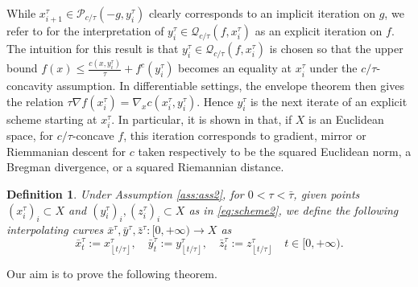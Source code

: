 \documentclass[reqno]{amsart}
\newcounter{results}[section]
\theoremstyle{plain}
\theoremstyle{remark}
\theoremstyle{plain}
\newtheorem{definition}[results]{Definition}
\numberwithin{equation}{section}
\theoremstyle{remark}
\newcommand{\floor}[1]{\left\lfloor#1\right\rfloor}
\begin{document}
    While $x_{i+1}^\tau \in \mathcal{P}_{c/\tau}(-g, y_i^\tau)$ clearly corresponds to an implicit iteration on $g$, we refer to \cite[Section 3]{leger2023gradient} for the interpretation of $y_i^\tau \in \mathcal{Q}_{c/\tau}(f,x_i^\tau)$ as an explicit iteration on $f$. 
    The intuition for this result is that $y_i^\tau \in \mathcal{Q}_{c/\tau}(f,x_i^\tau)$ is chosen so that the upper bound $f(x)\le\frac{c(x,y_i^\tau)}{\tau} +f^c(y_i^\tau)$ becomes an equality at $x_i^\tau$ under the $c/\tau$-concavity assumption. In differentiable settings, the envelope theorem then gives the relation $\tau \nabla f(x_i^\tau)= \nabla_x c(x_i^\tau,y_i^\tau)$. Hence $y_i^\tau$ is the next iterate of an explicit scheme starting at $x_i^\tau$.  In particular, it is shown in \cite{leger2023gradient} that,  if $X$ is an Euclidean space,  for $c/\tau$-concave $f$, this iteration corresponds to gradient, mirror or Riemmanian descent  for   $c$ taken respectively  to be   the squared Euclidean norm, a Bregman divergence, or a squared Riemannian distance.

\begin{definition}\label{def:interp2} Under Assumption \ref{ass:ass2}, for $0 < \tau < \bar{\tau}$,  given points $(x_i^\tau)_i \subset X$ and $(y_i^\tau)_i, (z_i^\tau)_i \subset  X $ as in \eqref{eq:scheme2}, we define the following interpolating curves 
$\bar{x}^\tau, 
\bar{y}^\tau, \bar{z}^\tau :[0,+\infty) \to  X $ as 
\[ \bar{x}^\tau_t:= x^\tau_{\floor{t/\tau}}, \quad \bar{y}^\tau_t:= y^\tau_{\floor{t/\tau}}, \quad \bar{z}^\tau_t:= z^\tau_{\floor{t/\tau}} \quad t \in [0,+\infty). \]
\end{definition}



 Our aim is to prove the following theorem.
\end{document}
